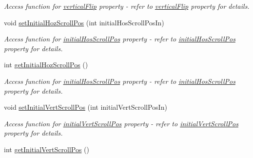 \begin{DoxyCompactItemize}
\begin{DoxyCompactList}\small\item\em Access function for \hyperlink{classQEImage_a0b4219b866cd2e75d70e1b58da369bae}{verticalFlip} property -\/ refer to \hyperlink{classQEImage_a0b4219b866cd2e75d70e1b58da369bae}{verticalFlip} property for details. \end{DoxyCompactList}\item 
\hypertarget{classQEImage_a9bafbb6b31b54ba12e52f68de561440e}{
void \hyperlink{classQEImage_a9bafbb6b31b54ba12e52f68de561440e}{setInitialHozScrollPos} (int initialHosScrollPosIn)}
\label{classQEImage_a9bafbb6b31b54ba12e52f68de561440e}

\begin{DoxyCompactList}\small\item\em Access function for \hyperlink{classQEImage_ab73dc427e7df7dacbdd4ca1a5df84eab}{initialHosScrollPos} property -\/ refer to \hyperlink{classQEImage_ab73dc427e7df7dacbdd4ca1a5df84eab}{initialHosScrollPos} property for details. \end{DoxyCompactList}\item 
\hypertarget{classQEImage_aa93e126a8a59a84c06b7cd6ffe118baa}{
int \hyperlink{classQEImage_aa93e126a8a59a84c06b7cd6ffe118baa}{getInitialHozScrollPos} ()}
\label{classQEImage_aa93e126a8a59a84c06b7cd6ffe118baa}

\begin{DoxyCompactList}\small\item\em Access function for \hyperlink{classQEImage_ab73dc427e7df7dacbdd4ca1a5df84eab}{initialHosScrollPos} property -\/ refer to \hyperlink{classQEImage_ab73dc427e7df7dacbdd4ca1a5df84eab}{initialHosScrollPos} property for details. \end{DoxyCompactList}\item 
\hypertarget{classQEImage_aa2a3e6c78ca333ce7aa21100d2412afa}{
void \hyperlink{classQEImage_aa2a3e6c78ca333ce7aa21100d2412afa}{setInitialVertScrollPos} (int initialVertScrollPosIn)}
\label{classQEImage_aa2a3e6c78ca333ce7aa21100d2412afa}

\begin{DoxyCompactList}\small\item\em Access function for \hyperlink{classQEImage_af4af8618263670a539f5f42f69378256}{initialVertScrollPos} property -\/ refer to \hyperlink{classQEImage_af4af8618263670a539f5f42f69378256}{initialVertScrollPos} property for details. \end{DoxyCompactList}\item 
\hypertarget{classQEImage_af74d745491b6dc728038d5019e90f92f}{
int \hyperlink{classQEImage_af74d745491b6dc728038d5019e90f92f}{getInitialVertScrollPos} ()}
\label{classQEImage_af74d745491b6dc728038d5019e90f92f}


\end{DoxyCompactItemize}
